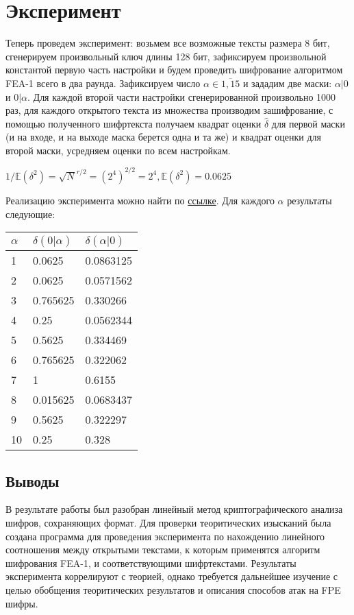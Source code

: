 \documentclass[utf8x, 14pt]{G7-32} %
\begin{document}
\chapter{Эксперимент}
Теперь проведем эксперимент: возьмем все возможные тексты размера 8 бит, сгенерируем произвольный ключ длины 128 бит, зафиксируем произвольной константой первую часть настройки и будем проведить шифрование алгоритмом FEA-1 всего в два раунда. Зафиксируем число $\alpha \in \overline{1,15}$ и зададим две маски: $\alpha|0$ и $0|\alpha$. Для каждой второй части настройки сгенерированной произвольно 1000 раз, для каждого открытого текста из множества производим зашифрование, с помощью полученного шифртекста получаем квадрат оценки $\hat{\delta}$ для первой маски (и на входе, и на выходе маска берется одна и та же) и квадрат оценки для второй маски, усредняем оценки по всем настройкам. 

$1/\mathbb{E}(\delta^2)=\sqrt{N}^{r/2} = (2^4)^{2/2} = 2^4, \mathbb{E}(\delta^2) = 0.0625$

Реализацию эксперимента можно найти по \href{https://github.com/jerrydie/course_work}{ссылке}. Для каждого $\alpha$ результаты следующие:

\begin{center}
\begin{tabular}{ |p{}| p{}| p{}| }
\hline
 $\alpha$ & $\delta(0|\alpha )$ & $\delta(\alpha|0)$ \\
 \hline
1 & 0.0625 & 0.0863125 \\
2 & 0.0625 & 0.0571562 \\
3 & 0.765625 & 0.330266 \\
4 & 0.25 & 0.0562344 \\
5 & 0.5625 & 0.334469 \\
6 & 0.765625 & 0.322062 \\
7 & 1 & 0.6155 \\
8 & 0.015625 & 0.0683437 \\
9 & 0.5625 & 0.322297 \\
10 & 0.25 & 0.328 \\
\hline
\end{tabular}
\end{center}

\section{Выводы}
В результате работы был разобран линейный метод криптографического анализа шифров, сохраняющих формат. Для проверки теоритических изысканий была создана программа для проведения эксперимента по нахождению линейного соотношения между открытыми текстами, к которым применятся алгоритм шифрования FEA-1, и соответствующими шифртекстами. Результаты эксперимента коррелируют с теорией, однако требуется дальнейшее изучение с целью обобщения теоритических результатов и описания способов атак на FPE шифры.





\backmatter %





%

%
\end{document}
